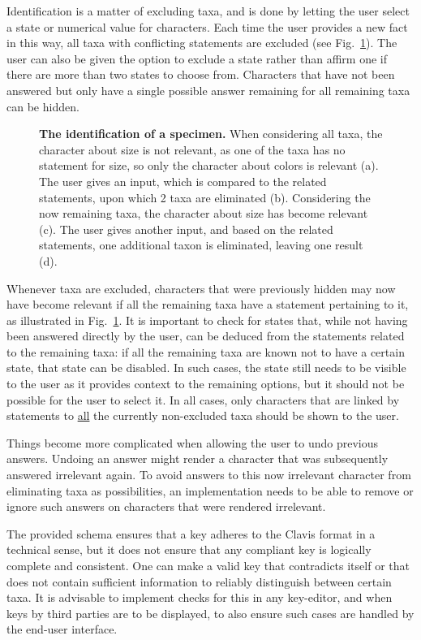 \documentclass[10pt,letterpaper]{article}
\begin{document}
Identification is a matter of excluding taxa, and is done by letting the user select a state or numerical value for characters. Each time the user provides a new fact in this way, all taxa with conflicting statements are excluded (see Fig.~\ref{fig2}). The user can also be given the option to exclude a state rather than affirm one if there are more than two states to choose from. Characters that have not been answered but only have a single possible answer remaining for all remaining taxa can be hidden.


\begin{figure}[!h]
  \caption{{\bf The identification of a specimen.}
  When considering all taxa, the character about size is not relevant, as one of the taxa has no statement for size, so only the character about colors is relevant (a). The user gives an input, which is compared to the related statements, upon which 2 taxa are eliminated (b). Considering the now remaining taxa, the character about size has become relevant (c). The user gives another input, and based on the related statements, one additional taxon is eliminated, leaving one result (d).
  }
  \label{fig2}
 \end{figure}

Whenever taxa are excluded, characters that were previously hidden may now have become relevant if all the remaining taxa have a statement pertaining to it, as illustrated in Fig.~\ref{fig2}. It is important to check for states that, while not having been answered directly by the user, can be deduced from the statements related to the remaining taxa: if all the remaining taxa are known not to have a certain state, that state can be disabled. In such cases, the state still needs to be visible to the user as it provides context to the remaining options, but it should not be possible for the user to select it. In all cases, only characters that are linked by statements to \underline{all} the currently non-excluded taxa should be shown to the user.

Things become more complicated when allowing the user to undo previous answers. Undoing an answer might render a character that was subsequently answered irrelevant again. To avoid answers to this now irrelevant character from eliminating taxa as possibilities, an implementation needs to be able to remove or ignore such answers on characters that were rendered irrelevant.

The provided schema ensures that a key adheres to the Clavis format in a technical sense, but it does not ensure that any compliant key is logically complete and consistent. One can make a valid key that contradicts itself or that does not contain sufficient information to reliably distinguish between certain taxa. It is advisable to implement checks for this in any key-editor, and when keys by third parties are to be displayed, to also ensure such cases are handled by the end-user interface.
\end{document}
